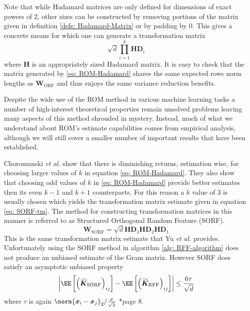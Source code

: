 Note that while Hadamard matrices are only defined for dimensions of exact powers of 2, other sizes can be constructed by removing portions of the matrix given in definition \ref{defe: Hadamard-Matrix} or by padding by $0$. This gives a concrete means for which one can generate a transformation matrix
\begin{equation} \label{eq: ROM-Hadamard}
    \sqrt{d} \prod_{i=1}^{k} \bm{H} \bm{D}_{i}
\end{equation}
where $\bm{H}$ is an appropriately sized Hadamard matrix. It is easy to check that the matrix generated by \ref{eq: ROM-Hadamard} shares the same expected rows norm lengths as $\bm{W}_{\text{ORF}}$ and thus enjoys the same variance reduction benefits.

Despite the wide use of the ROM method in various machine learning tasks \cite{ChoromanskiKrzysztof2017TUEo,AndoniAlexandr2015PaOL,ChoromanskiKrzysztof2020RAwP} a number of high-interest theoretical properties remain unsolved problems leaving many aspects of this method shrouded in mystery. Instead, much of what we understand about ROM's estimate capabilities comes from empirical analysis, although we will still cover a smaller number of important results that have been established.

Choromanski {\it et al.} \cite{ChoromanskiKrzysztof2017TUEo} show that there is diminishing returns, estimation wise, for choosing larger values of $k$ in equation \ref{eq: ROM-Hadamard}. They also show that choosing odd values of $k$ in \ref{eq: ROM-Hadamard} provide better estimates then its even $k-1$ and $k+1$ counterparts. For this reason a $k$ value of $3$ is usually chosen which yields the transformation matrix estimate given in equation \ref{eq: SORF-tm}. The method for constructing transformation matrices in this manner is referred to as Structured Orthogonal Random Feature (SORF).
\begin{equation} \label{eq: SORF-tm}
    \bm{W}_{\text{SORF}} = \sqrt{d} \bm{H} \bm{D}_{3} \bm{H} \bm{D}_{2} \bm{H} \bm{D}_{1}
\end{equation}
This is the same transformation matrix estimate that Yu {\it et al.} provides. Unfortunately using the SORF method in algorithm \ref{alg: RFF-algorithm} does not produce an unbiased estimate of the Gram matrix. However SORF does satisfy an asymptotic unbiased property
\begin{equation*}
    \left| \EE \left[ \left( \bm{\widetilde{K}}_{\text{SORF}} \right)_{ij} \right] - \EE \left[ \left( \bm{\widetilde{K}}_{\text{RFF}} \right)_{ij} \right] \right| \leq \frac{6 \tau}{\sqrt{d}}
\end{equation*}
where $\tau$ is again $\norm{\bm{x}_i - \bm{x}_j}_2 / \frac{\sigma}{\sqrt{2}}$ \cite{LiuFanghui2021RFfK}*{page 8}.

